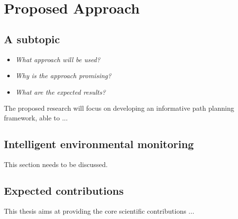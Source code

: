 \section{Proposed Approach}
\label{S:proposed_approach}

\subsection{A subtopic}
\begin{itemize}
	\item \emph{What approach will be used?}
	\item \emph{Why is the approach promising?}
	\item \emph{What are the expected results?}
\end{itemize}

\hrulefill

The proposed research will focus on developing an informative path planning framework, able to ...


\subsection{Intelligent environmental monitoring}

This section needs to be discussed.
 
\subsection{Expected contributions}
This thesis aims at providing the core scientific contributions ...